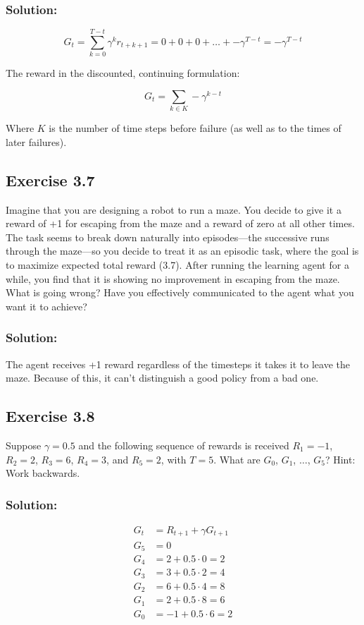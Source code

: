 \subsubsection*{Solution:}

\[
G_t = \sum_{k=0}^{T-t} \gamma^k r_{t+k+1} = 0 + 0 + 0 + \dots + -\gamma^{T-t} = -\gamma^{T-t}
\]

The reward in the discounted, continuing formulation:

\[
G_t = \sum_{k \in K} -\gamma^{k-t}
\]

Where $K$ is the number of time steps before failure (as well as to the times of later failures).


\subsection*{Exercise 3.7} Imagine that you are designing a robot to run a maze. You decide to give it a
reward of +1 for escaping from the maze and a reward of zero at all other times. The task
seems to break down naturally into episodes—the successive runs through the maze—so
you decide to treat it as an episodic task, where the goal is to maximize expected total
reward (3.7). After running the learning agent for a while, you find that it is showing
no improvement in escaping from the maze. What is going wrong? Have you effectively
communicated to the agent what you want it to achieve?

\subsubsection*{Solution:}

The agent receives +1 reward regardless of the timesteps it takes it to leave the maze. Because of this, it can't distinguish a good policy from a bad one.

\subsection*{Exercise 3.8}
Suppose $\gamma = 0.5$ and the following sequence of rewards is received $R_1 = -1$, $R_2 = 2$, $R_3 = 6$, $R_4 = 3$, and $R_5 = 2$, with $T = 5$. What are $G_0$, $G_1$, $\dots$, $G_5$? Hint:
Work backwards.

\subsubsection*{Solution:}

\begin{equation}
    \begin{aligned}
        G_t &= R_{t+1} + \gamma G_{t+1} \\
        G_5 &= 0 \\
        G_4 &= 2 + 0.5 \cdot 0 = 2 \\
        G_3 &= 3 + 0.5 \cdot 2 = 4 \\
        G_2 &= 6 + 0.5 \cdot 4 = 8 \\
        G_1 &= 2 + 0.5 \cdot 8 = 6 \\
        G_0 &= -1 + 0.5 \cdot 6 = 2 
    \end{aligned}
\end{equation}



